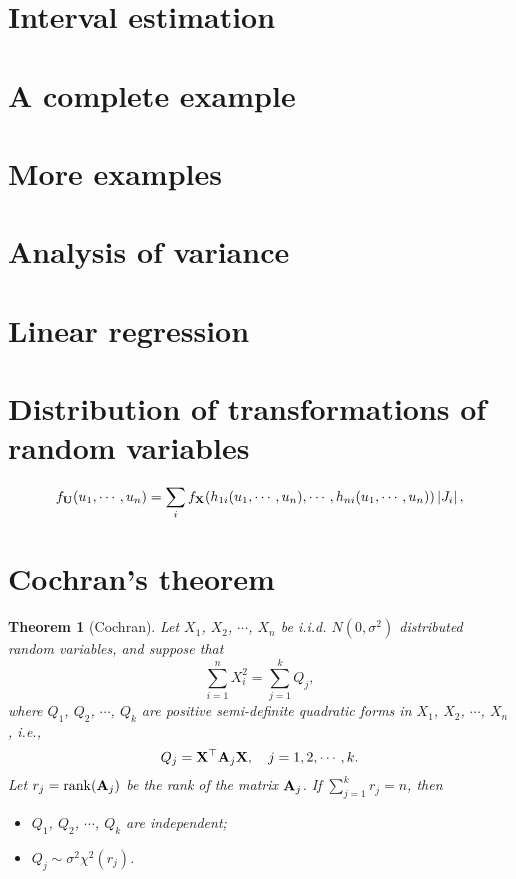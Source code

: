 \documentclass[12pt]{article}
\newtheorem{theorem}{Theorem}[section]
\theoremstyle{definition}
\begin{document}
\section{Interval estimation}

\section{A complete example}

\section{More examples}

\section{Analysis of variance}

\section{Linear regression}

\appendix

  \section{Distribution of transformations of random variables}
  \label{tf}

    \begin{equation}
      f_{{\bf U}}(u_1,\cdots,u_n)=\sum_{i}f_{{\bf X}}
                 (h_{1i}(u_1,\cdots,u_n),\cdots,h_{ni}(u_1,\cdots,u_n))\left|J_i\right|,
    \end{equation}

  \section{Cochran's theorem}

    \begin{theorem}[Cochran]
      Let $X_1$, $X_2$, $\cdots$, $X_n$ be i.i.d. $N(0,\sigma^2)$ distributed random
      variables, and suppose that
      \[\sum_{i=1}^n X_i^2 = \sum_{j=1}^k Q_j, \]
      where $Q_1$, $Q_2$, $\cdots$, $Q_k$ are positive semi-definite quadratic forms in
      $X_1$, $X_2$, $\cdots$, $X_n$, {\it i.e.},
      \[ Q_j = {\bf X}^{\top}{\bf A}_j{\bf X},\quad j=1,2,\cdots,k. \]
      Let $r_j={\rm rank}({\bf A}_j)$ be the rank of the matrix ${\bf A}_j$. If $\sum_{j=1}^kr_j=n$,
      then
      \begin{itemize}
        \item $Q_1$, $Q_2$, $\cdots$, $Q_k$ are independent;
        \item $Q_j \sim \sigma^2\chi^2(r_j)$.
      \end{itemize}
    \end{theorem}
\end{document}
